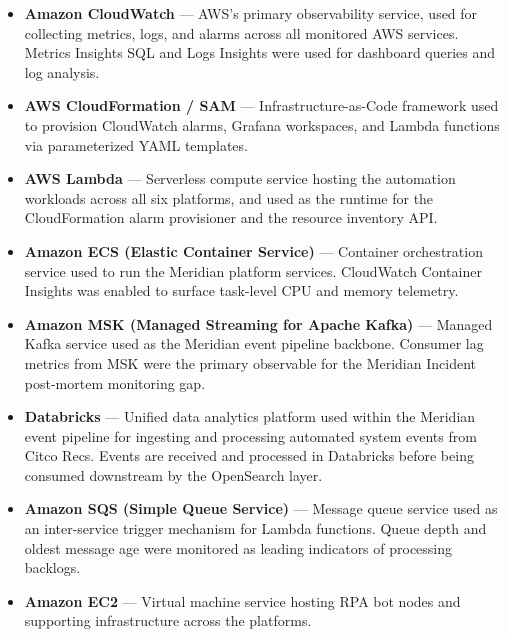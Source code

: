 \begin{itemize}

      \item \textbf{Amazon CloudWatch} --- AWS's primary observability
          service, used for collecting metrics, logs, and alarms across
          all monitored AWS services. Metrics Insights SQL and Logs
          Insights were used for dashboard queries and log analysis.

      \item \textbf{AWS CloudFormation / SAM} --- Infrastructure-as-Code
          framework used to provision CloudWatch alarms, Grafana
          workspaces, and Lambda functions via parameterized YAML templates.

    \item \textbf{AWS Lambda} --- Serverless compute service hosting
          the automation workloads across all six platforms, and used
          as the runtime for the CloudFormation alarm provisioner and
          the resource inventory API.

    \item \textbf{Amazon ECS (Elastic Container Service)} ---
          Container orchestration service used to run the Meridian
          platform services. CloudWatch Container Insights was enabled
          to surface task-level CPU and memory telemetry.

    \item \textbf{Amazon MSK (Managed Streaming for Apache Kafka)} ---
          Managed Kafka service used as the Meridian event pipeline
          backbone. Consumer lag metrics from MSK were the primary
          observable for the Meridian Incident post-mortem monitoring gap.

    \item \textbf{Databricks} --- Unified data analytics platform used
          within the Meridian event pipeline for ingesting and processing
          automated system events from Citco Recs. Events are received
          and processed in Databricks before being consumed downstream
          by the OpenSearch layer.

    \item \textbf{Amazon SQS (Simple Queue Service)} --- Message queue
          service used as an inter-service trigger mechanism for Lambda
          functions. Queue depth and oldest message age were monitored
          as leading indicators of processing backlogs.

    \item \textbf{Amazon EC2} --- Virtual machine service hosting
          RPA bot nodes and supporting infrastructure across the platforms.


\end{itemize}
